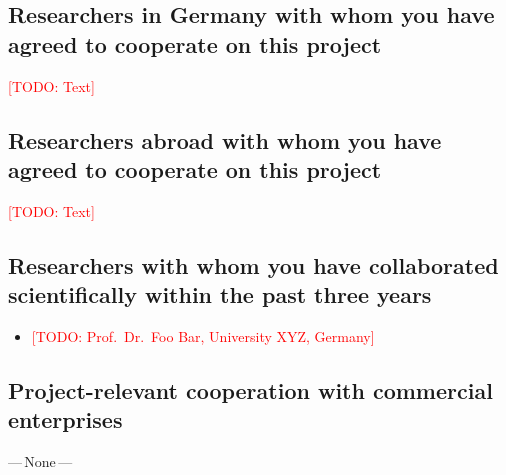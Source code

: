 \documentclass[american,firsttime]{dfgproposal}
\newcommand{\todo}[1]{\xspace{\textcolor{red}{[TODO: #1]}}\xspace}
\begin{document}
	
	\subsection{Researchers in Germany with whom you have agreed to cooperate on this project}
	\todo{Text}
	
	\subsection{Researchers abroad with whom you have agreed to cooperate on this project}
	\todo{Text}
	
	\subsection{Researchers with whom you have collaborated scientifically within the past three years}
	\begin{itemize}
		\item \todo{Prof.~Dr.~Foo Bar, University XYZ, Germany}
	\end{itemize}
	
	\subsection{Project-relevant cooperation with commercial enterprises}
	---\,None\,---
	
\end{document}
